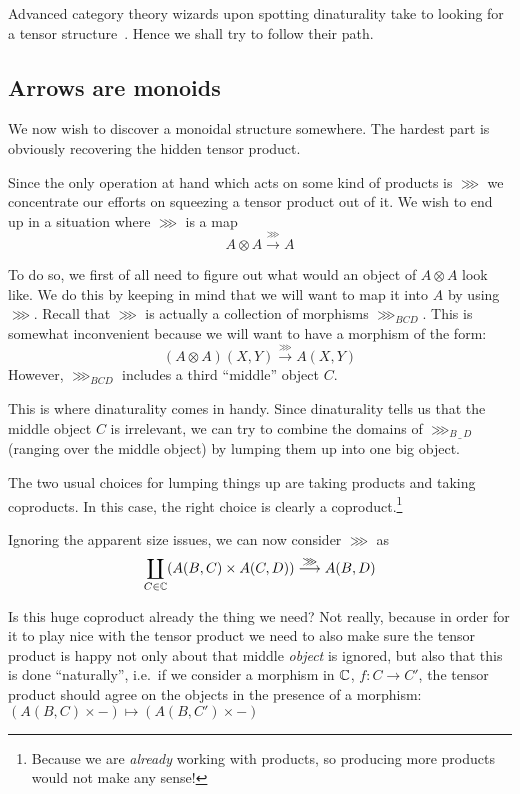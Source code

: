 Advanced category theory wizards upon spotting dinaturality take to looking
for a tensor structure~\cite[p.~8]{arr-like-mon}. Hence we shall try to
follow their path.

\subsection{Arrows are monoids}

We now wish to discover a monoidal structure somewhere. The hardest part is
obviously recovering the hidden tensor product.

Since the only operation at hand which acts on some kind of products is $\ggg$
we concentrate our efforts on squeezing a tensor product out of it. We wish
to end up in a situation where $\ggg$ is a map
    \[ A \otimes A \overset{\ggg}{\longrightarrow} A \]

To do so, we first of all need to figure out what would an object of $A \otimes A$
look like. We do this by keeping in mind that we will want to map it into $A$
by using $\ggg$. Recall that $\ggg$ is actually a collection of morphisms
$\ggg_{BCD}$. This is somewhat inconvenient because we will want to have a
morphism of the form:
    \[ (A \otimes A)(X, Y) \overset{\ggg}{\longrightarrow} A(X, Y) \]
However, $\ggg_{BCD}$ includes a third ``middle'' object $C$.

This is where dinaturality comes in handy. Since dinaturality tells us that the
middle object $C$ is irrelevant, we can try to combine the domains of
$\ggg_{B\,\_ \,D}$ (ranging over the middle object) by lumping them up into one big
object.

The two usual choices for lumping things up are taking products and taking
coproducts. In this case, the right choice is clearly a
coproduct.\footnote{Because we are \emph{already} working with products, so
producing more products would not make any sense!}

Ignoring the apparent size issues, we can now consider $\ggg$ as
\[ \coprod_{C \in \mathbb{C}} (A(B, C) \times A(C, D))
    \overset{\ggg}{\longrightarrow} A(B, D) \]

Is this huge coproduct already the thing we need? Not really, because in order
for it to play nice with the tensor product we need to also make sure the tensor
product is happy not only about that middle \emph{object} is ignored, but
also that this is done ``naturally'', i.e.~if we consider a morphism in
$\mathbb{C}$, $f: C \to C'$, the tensor product should agree on the objects in the
presence of a morphism:
$\left( A(B, C) \times -\right) \mapsto
    \left( A(B, C') \times - \right)$

